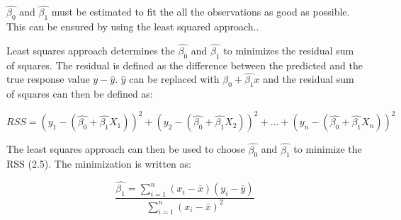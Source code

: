



$\hat{\beta_0}$ and  $\hat{\beta_1}$ must be estimated to fit the all the observations as good as possible. This can be ensured by using the least squared approach..


Least squares approach determines the $\hat{\beta_0}$ and  $\hat{\beta_1}$ to minimizes the residual sum of squares.
The residual is defined as the difference between the predicted and the true response value $y-\hat{y}$. $\hat{y}$ can be replaced with $\hat{\beta_0} + \hat{\beta_1}x$ and the residual sum of squares can then be defined as:

\begin{equation}
RSS = (y_1 - (\hat{\beta_0} + \hat{\beta_1}X_1))^2 + (y_2 - (\hat{\beta_0} + \hat{\beta_1}X_2))^2 + ... + (y_n - (\hat{\beta_0} + \hat{\beta_1}X_n))^2
\end{equation}

The least squares approach can then be used to choose $\hat{\beta_0}$ and $\hat{\beta_1}$ to minimize the RSS (2.5).
The minimization is written as:

\begin{equation}
\dfrac{\hat{\beta_1} = \sum\limits_{i=1}^n(x_i - \bar{x})(y_i - \bar{y})}{\sum\limits_{i=1}^n(x_i - \bar{x})^2}
\end{equation}

